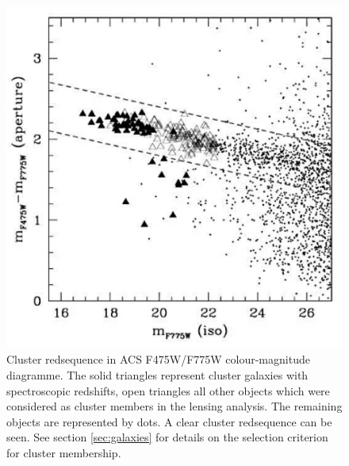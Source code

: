 \documentclass[useAMS,usenatbib]{mn2e}
\begin{document}
\begin{figure}
  \centering
  \includegraphics[height=\columnwidth]{figs/RS.ps}
  \caption{Cluster redsequence in ACS F475W/F775W colour-magnitude
    diagramme. The solid triangles represent cluster galaxies with
    spectroscopic redshifts, open triangles all other objects which
    were considered as cluster members in the lensing analysis. The
    remaining objects are represented by dots. A clear cluster
    redsequence can be seen. See section \ref{sec:galaxies} for
    details on the selection criterion for cluster membership.}
  \label{fig:redseq}
\end{figure}
\end{document}
